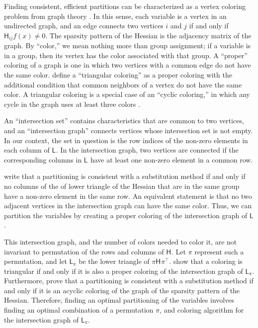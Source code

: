 \documentclass[article]{jss}\usepackage[]{graphicx}\usepackage[]{color}
\newcommand{\hess}[2]{\mathsf{H}_{#1}#2}
\newcommand{\hessLT}[2]{\mathsf{L}_{#1}#2}
\begin{document}
Finding consistent, efficient partitions can be
characterized as a vertex coloring problem from graph theory \citep{ColemanMore1984}.  In this
sense, each variable is a vertex in an undirected graph, and an edge connects two
vertices $i$ and $j$ if and only if ${\hess{ij}{f(x)}\neq 0}$.  The
sparsity pattern of the Hessian is the adjacency matrix of the graph.
By ``color,'' we mean nothing more than group assignment; if a
variable is in a group, then its vertex has the color associated with
that group.  A ``proper'' coloring of a graph is one in which two
vertices with a common edge do not have the same
color.  define a ``triangular coloring'' as
a proper coloring with the additional condition that common
neighbors of a vertex do not have the same color.  A triangular
coloring is a special case of an ``cyclic coloring,'' in which any cycle in the graph
uses at least three colors \citep{GebremedhinTarafdar2007}.

An ``intersection set'' contains characteristics that are common to two vertices, and
an ``intersection graph'' connects vertices whose intersection set is
not empty.  In our context, the set in question is the row indices of
the non-zero elements in each column of $\hessLT{}{}$.  In the
intersection graph, two vertices are connected if the corresponding
columns in $\hessLT{}{}$ have at least one non-zero element in a common row.

 write that a partitioning is consistent with a
substitution method if and only if no columns
of the of lower triangle of the Hessian that are
in the same group have a non-zero element in the same
row.  An equivalent statement is that no two adjacent vertices in the
intersection graph can have the same color.  Thus, we can partition
the variables by creating a proper coloring of the intersection graph
of $\hessLT{}{}$.

This intersection graph, and the number of colors needed to
color it, are not invariant to
permutation of the rows and columns of $\hess{}{}$.  Let $\pi$
represent such a permutation, and let $\hessLT{\pi}{}$ be the lower
triangle of $\pi\hess{}{}{\pi^\top}$.     show that a coloring is triangular if and only
if it is also a proper coloring of the intersection
graph of $\hessLT{\pi}{}$.  Furthermore,
\citet{ColemanCai1986} prove that a partitioning is consistent with a
substitution method if and only if it is an acyclic coloring of the
graph of the sparsity pattern of the Hessian.   Therefore,
finding an optimal partitioning of the variables involves finding an
optimal combination of a permutation $\pi$, and coloring algorithm
for the intersection graph of $\hessLT{\pi}{}$.
\end{document}
